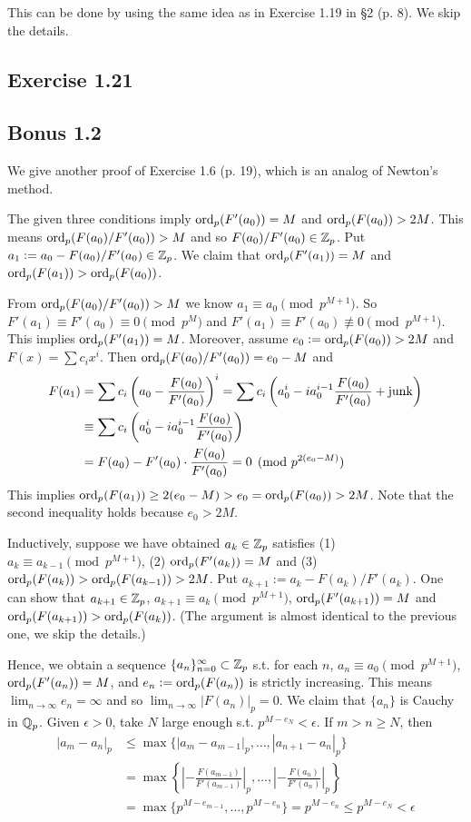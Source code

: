 \documentclass[../Koblitz.tex]{subfiles}
\begin{document}
This can be done by using the same idea as in Exercise 1.19 in \S2 (p. 8). We skip the details.

\subsection*{Exercise 1.21}

\subsection*{Bonus 1.2} \label{Bonus 1.2}

We give another proof of Exercise 1.6 (p. 19), which is an analog of Newton's method.

The given three conditions imply $\operatorname{ord}_p(F'(a_0))=M$ and $\operatorname{ord}_p(F(a_0))>2M$. This means $\operatorname{ord}_p(F(a_0)/F'(a_0))>M$ and so $F(a_0)/F'(a_0)\in\mathbb{Z}_p$. Put $a_1:=a_0-F(a_0)/F'(a_0)\in\mathbb{Z}_p$. We claim that $\operatorname{ord}_p(F'(a_1))=M$ and $\operatorname{ord}_p(F(a_1))>\operatorname{ord}_p(F(a_0))$.

From $\operatorname{ord}_p(F(a_0)/F'(a_0))>M$ we know $a_1\equiv a_0 \pmod{p^{M+1}}$. So $F'(a_1)\equiv F'(a_0)\equiv0\pmod{p^M}$ and $F'(a_1)\equiv F'(a_0)\not\equiv0\pmod{p^{M+1}}$. This implies $\operatorname{ord}_p(F'(a_1))=M$. Moreover, assume $e_0:=\operatorname{ord}_p(F(a_0))>2M$ and $F(x)=\sum c_ix^i$. Then $\operatorname{ord}_p(F(a_0)/F'(a_0))=e_0-M$ and
\begin{align*}
    F(a_1) &= \sum c_i\left(a_0-\frac{F(a_0)}{F'(a_0)}\right)^i = \sum c_i\left(a_0^i - ia_0^{i-1}\frac{F(a_0)}{F'(a_0)}+\operatorname{junk}\right) \\
    &\equiv \sum c_i\left(a_0^i - ia_0^{i-1}\frac{F(a_0)}{F'(a_0)}\right) \\
    &= F(a_0) - F'(a_0)\cdot\frac{F(a_0)}{F'(a_0)} = 0 \pmod{p^{2(e_0-M)}}
\end{align*}
This implies $\operatorname{ord}_p(F(a_1)) \geq 2(e_0-M) > e_0 = \operatorname{ord}_p(F(a_0)) > 2M$. Note that the second inequality holds because $e_0>2M$.

Inductively, suppose we have obtained $a_k\in\mathbb{Z}_p$ satisfies (1) $a_k\equiv a_{k-1} \pmod{p^{M+1}}$, (2) $\operatorname{ord}_p(F'(a_k))=M$ and (3) $\operatorname{ord}_p(F(a_k))>\operatorname{ord}_p(F(a_{k-1}))>2M$. Put $a_{k+1}:=a_k-F(a_k)/F'(a_k)$. One can show that $a_{k+1}\in\mathbb{Z}_p$, $a_{k+1}\equiv a_k \pmod{p^{M+1}}$, $\operatorname{ord}_p(F'(a_{k+1}))=M$ and $\operatorname{ord}_p(F(a_{k+1})) > \operatorname{ord}_p(F(a_k))$. (The argument is almost identical to the previous one, we skip the details.)

Hence, we obtain a sequence $\{a_n\}_{n=0}^\infty\subset\mathbb{Z}_p$ s.t. for each $n$, $a_n\equiv a_0 \pmod{p^{M+1}}$, $\operatorname{ord}_p(F'(a_n))=M$, and $e_n:=\operatorname{ord}_p(F(a_n))$ is strictly increasing.
This means $\lim_{n\to\infty} e_n=\infty$ and so $\lim_{n\to\infty} |F(a_n)|_p=0$. We claim that $\{a_n\}$ is Cauchy in $\mathbb{Q}_p$. Given $\epsilon>0$, take $N$ large enough s.t. $p^{M-e_N}<\epsilon$. If $m>n\geq N$, then
\begin{align*}
    |a_m-a_n|_p &\leq \max\{|a_m-a_{m-1}|_p,\ldots,|a_{n+1}-a_n|_p\} \\
    &= \max\left\{ \left|-\frac{F(a_{m-1})}{F'(a_{m-1})}\right|_p ,\ldots, \left|-\frac{F(a_n)}{F'(a_n)}\right|_p \right\} \\
    &= \max\{ p^{M-e_{m-1}},\ldots,p^{M-e_n} \} = p^{M-e_n} \leq p^{M-e_N} < \epsilon
\end{align*}
\end{document}
